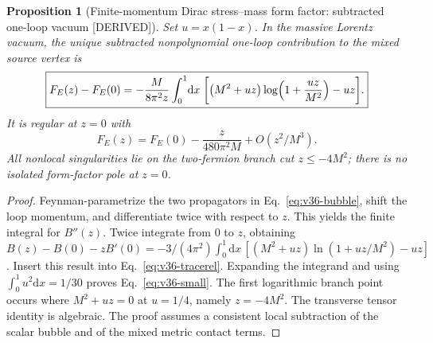 \documentclass[11pt,a4paper]{article}
\newtheorem{proposition}[theorem]{Proposition}
\theoremstyle{remark}\newtheorem{remark}[theorem]{Remark}
\newcommand{\dd}{\mathrm d}\newcommand{\Tr}{\operatorname{Tr}}\newcommand{\cO}{\mathcal O}\newcommand{\cG}{\mathcal G}\newcommand{\cH}{\mathcal H}\newcommand{\cE}{\mathcal E}\newcommand{\cK}{\mathcal K}\newcommand{\AX}{\textsf{[AXIOM]}}\newcommand{\D}{\textsf{[DERIVED]}}\newcommand{\C}{\textsf{[CONDITIONAL]}}\newcommand{\OPEN}{\textsf{[OPEN]}}
\begin{document}
\begin{proposition}[Finite-momentum Dirac stress--mass form factor: subtracted one-loop vacuum \D]\label{prop:v36-formfactor}
Set $u=x(1-x)$. In the massive Lorentz vacuum, the unique subtracted nonpolynomial one-loop contribution to the mixed source vertex is
\begin{equation}\label{eq:v36-F}
\boxed{F_E(z)-F_E(0)=-\frac{M}{8\pi^2z}\int_0^1\!\dd x\;\biggl[\bigl(M^2+uz\bigr)\log\Bigl(1+\frac{uz}{M^2}\Bigr)-uz\biggr].}
\end{equation}
It is regular at $z=0$ with
\begin{equation}\label{eq:v36-small}
\boxed{F_E(z)=F_E(0)-\frac{z}{480\pi^2M}+O(z^2/M^3).}
\end{equation}
All nonlocal singularities lie on the two-fermion branch cut $z\leq-4M^2$; there is no isolated form-factor pole at $z=0$.
\end{proposition}
\begin{proof}
Feynman-parametrize the two propagators in Eq.~\eqref{eq:v36-bubble}, shift the loop momentum, and differentiate twice with respect to $z$. This yields the finite integral for $B''(z)$. Twice integrate from $0$ to $z$, obtaining $B(z)-B(0)-zB'(0)=-3/(4\pi^2)\int_0^1\dd x\,[(M^2+uz)\ln(1+uz/M^2)-uz]$. Insert this result into Eq.~\eqref{eq:v36-tracerel}. Expanding the integrand and using $\int_0^1u^2\dd x=1/30$ proves Eq.~\eqref{eq:v36-small}. The first logarithmic branch point occurs where $M^2+uz=0$ at $u=1/4$, namely $z=-4M^2$. The transverse tensor identity is algebraic. The proof assumes a consistent local subtraction of the scalar bubble and of the mixed metric contact terms. \qedhere
\end{proof}
\end{document}
